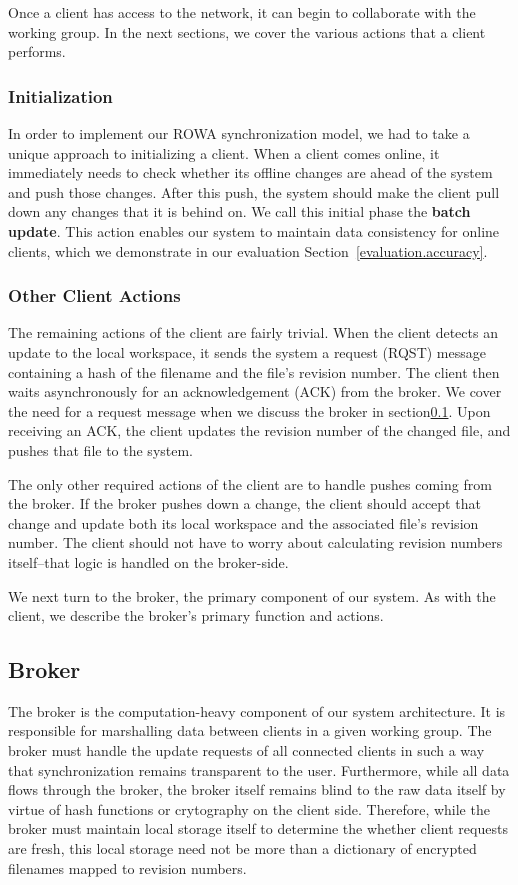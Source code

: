 Once a client has access to the network,
it can begin to collaborate with the working group.
In the next sections, we cover the various actions
that a client performs.

\subsubsection{Initialization}
In order to implement our ROWA synchronization model,
we had to take a unique approach to initializing a client.
When a client comes online,
it immediately needs to check whether its offline changes
are ahead of the system and push those changes.
After this push, the system should make the client
pull down any changes that it is behind on.
We call this initial phase the \textbf{batch update}.
This action enables our system to maintain data consistency
for online clients, which we demonstrate in our evaluation
Section~\ref{evaluation.accuracy}.

\subsubsection{Other Client Actions}
The remaining actions of the client are fairly trivial.
When the client detects an update to the local workspace,
it sends the system a request (RQST) message containing a hash
of the filename and the file's revision number.
The client then waits asynchronously for an acknowledgement
(ACK) from the broker.
We cover the need for a request message when we discuss the broker
in section\ref{broker}.
Upon receiving an ACK, the client updates the revision
number of the changed file,
and pushes that file to the system.

The only other required actions of the client are to handle
pushes coming from the broker.
If the broker pushes down a change,
the client should accept that change and update both its
local workspace and the associated file's revision number.
The client should not have to worry about calculating
revision numbers itself--that logic is handled on the broker-side.

We next turn to the broker,
the primary component of our system.
As with the client, we describe the broker's primary
function and actions.

\subsection{Broker}
\label{broker}
The broker is the computation-heavy component of our system architecture.
It is responsible for marshalling data between clients in a given
working group. The broker must handle the update requests
of all connected clients in such a way that
synchronization remains transparent to the user.
Furthermore, while all data flows through the broker,
the broker itself remains blind to the raw data itself by virtue
of hash functions or crytography on the client side.
Therefore, while the broker must maintain local storage
itself to determine the whether client requests are fresh,
this local storage need not be more than a dictionary of 
encrypted filenames mapped to revision numbers.

